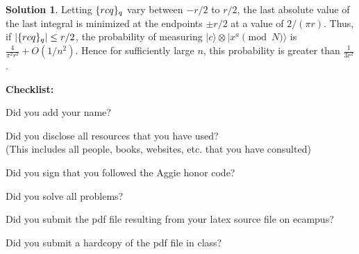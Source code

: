 \documentclass{article}
\theoremstyle{definition}
\newtheorem*{solution}{Solution}
\newcommand{\ket}[1]{|#1\rangle}
\newcommand{\checklist}{\noindent\textbf{Checklist:}
\begin{compactitem}[$\Box$] 
\item Did you add your name? 
\item Did you disclose all resources that you have used? \\
(This includes all people, books, websites, etc. that you have consulted)
\item Did you sign that you followed the Aggie honor code? 
\item Did you solve all problems? 
\item Did you submit the pdf file resulting from your latex source
  file on ecampus? 
\item Did you submit a hardcopy of the pdf file in class? 
\end{compactitem}
}
\begin{document}
\begin{solution}
Letting $\{rcq\}_q$ vary between $-r/2$ to $r/2$, the last absolute value of the last integral is minimized at the endpoints $\pm r/2$ at 
a value of $2/(\pi r)$.  Thus, if $|\{rcq\}_q| \le r/2$, the probability of measuring $\ket{c} \otimes \ket{x^a \pmod N}$ is 
$\frac{4}{\pi^2 r^2} + O(1/n^2)$.  Hence for sufficiently large $n$, this probability is greater than $\frac{1}{3r^2}$.
\end{solution}




\goodbreak
\checklist
\end{document}
